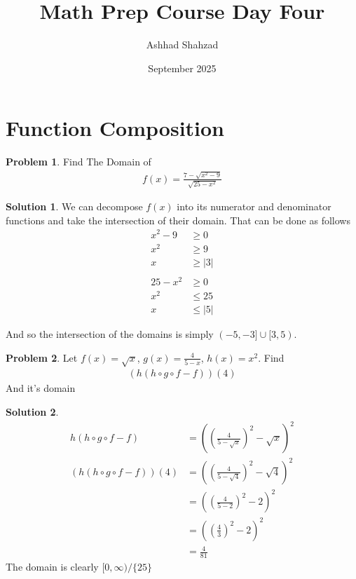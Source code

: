 \documentclass[a4paper]{article}
\title{Math Prep Course Day Four}
\author{Ashhad Shahzad}
\date{September 2025}
\theoremstyle{definition}
\newtheorem{problem}{Problem}[section]
\newtheorem*{solution}{Solution}
\begin{document}
\maketitle

\section{Function Composition}

\begin{problem}{Find The Domain of}
\begin{align*}
f(x) = \frac{7 -\sqrt{x^2-9}}{\sqrt{25-x^2}}
\end{align*}
\end{problem}

\begin{solution}
We can decompose \(f(x)\) into its numerator and denominator functions and take the intersection of their domain. That can be done as follows
\begin{align*}
x^2 - 9 &\geq 0 \\
x^2 &\geq 9 \\
x &\geq |3| \\ \\
25 - x^2 &\geq 0 \\
x^2 &\leq 25 \\
x &\leq |5|
\end{align*}

And so the intersection of the domains is simply \((-5, -3] \cup [3, 5)\).
\end{solution}


\begin{problem}
Let \(f(x) = \sqrt{x}\), \(g(x) = \frac{4}{5-x}\), \(h(x) = x^2\). Find
\begin{align*}
(h(h \circ g\circ f - f))(4)
\end{align*}
And it's domain
\end{problem}

\begin{solution}
\begin{align*}
h(h \circ g \circ f- f) &= \left(\left(\frac{4}{5-\sqrt{x}}\right)^2 -\sqrt{x}\right)^2 \\
(h(h \circ g\circ f -f))(4) &= \left(\left(\frac{4}{5-\sqrt{4}}\right)^2 - \sqrt{4}\right)^2 \\
    &= \left(\left(\frac{4}{5-2}\right)^2 - 2\right)^2 \\
    &= \left(\left(\frac{4}{3}\right)^2 - 2\right)^2 \\
    &= \frac{4}{81}
\end{align*}
The domain is clearly \([0, \infty)/\{25\}\)
\end{solution}
\end{document}
